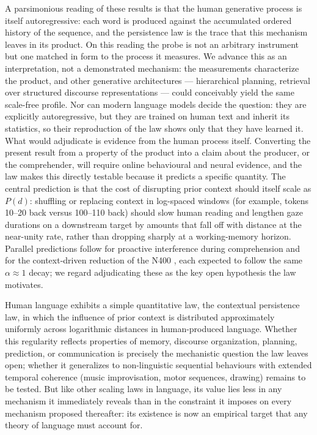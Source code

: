 \documentclass[11pt]{article}
\begin{document}
A parsimonious reading of these results is that the human generative process is itself
autoregressive: each word is produced against the accumulated ordered history of the sequence,
and the persistence law is the trace that this mechanism leaves in its product. On this reading
the probe is not an arbitrary instrument but one matched in form to the process it measures. We
advance this as an interpretation, not a demonstrated mechanism: the measurements characterize
the product, and other generative architectures --- hierarchical planning, retrieval over
structured discourse representations --- could conceivably yield the same scale-free profile.
Nor can modern language models decide the question: they are explicitly autoregressive, but they
are trained on human text and inherit its statistics, so their reproduction of the law shows only
that they have learned it. What would adjudicate is evidence from the human process itself.
Converting the present result from a property of the product into a claim about the producer,
or the comprehender, will require online behavioural and neural evidence, and the law makes
this directly testable because it predicts a specific quantity. The central prediction is that the
cost of disrupting prior context should itself scale as $P(d)$: shuffling or replacing context in
log-spaced windows (for example, tokens 10--20 back versus 100--110 back) should slow human
reading and lengthen gaze durations on a downstream target \citep{hale2001probabilistic, levy2008expectation, smith2013effect, futrell2020lossy} by amounts that fall off with distance
at the near-unity rate, rather than dropping sharply at a working-memory horizon. Parallel
predictions follow for proactive interference during comprehension and for the context-driven
reduction of the N400 \citep{kutas2011thirty}, each expected to follow the same
$\alpha \approx 1$ decay; we regard adjudicating these as the key open hypothesis the law
motivates.

Human language exhibits a simple quantitative law, the contextual
persistence law, in which the influence of prior context is distributed approximately
uniformly across logarithmic distances in human-produced language. Whether this regularity reflects
properties of memory, discourse organization, planning, prediction, or communication is
precisely the mechanistic question the law leaves open; whether it generalizes
to non-linguistic sequential behaviours with extended temporal coherence (music improvisation,
motor sequences, drawing) remains to be tested. But like other scaling laws in language, its
value lies less in any mechanism it immediately reveals than in the constraint it imposes on
every mechanism proposed thereafter: its existence is now an empirical target that any theory of
language must account for.
\end{document}
